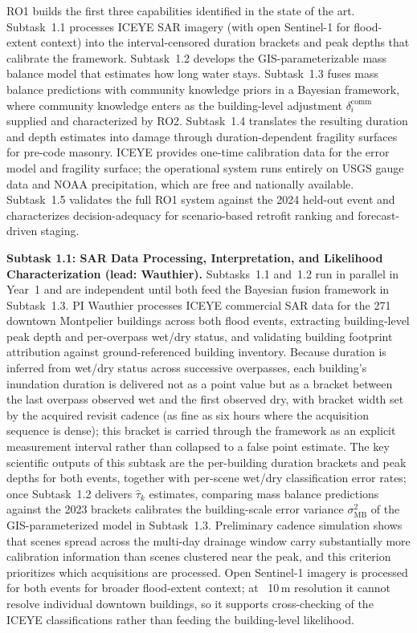 \documentclass[11pt]{article}
\begin{document}
RO1 builds the first three capabilities identified in the state of the art.
Subtask~1.1 processes ICEYE SAR imagery (with open Sentinel-1 for flood-extent
context) into the interval-censored duration brackets and peak depths that
calibrate the framework. Subtask~1.2 develops the GIS-parameterizable mass balance
model that estimates how long water stays. Subtask~1.3 fuses mass balance
predictions with community knowledge priors in a Bayesian framework, where
community knowledge enters as the building-level adjustment
$\delta_i^{\mathrm{comm}}$ supplied and characterized by RO2. Subtask~1.4
translates the resulting duration and depth estimates into damage through
duration-dependent fragility surfaces for pre-code masonry.
ICEYE provides one-time calibration data for the error model and fragility
surface; the operational system runs entirely on USGS gauge data and NOAA
precipitation, which are free and nationally available.
Subtask~1.5 validates the full RO1 system against the 2024 held-out event and
characterizes decision-adequacy for scenario-based retrofit ranking and forecast-driven staging.

\textbf{Subtask 1.1: SAR Data Processing, Interpretation, and Likelihood Characterization
(lead: Wauthier).}
Subtasks~1.1 and~1.2 run in parallel in Year~1 and are independent until both feed the Bayesian fusion framework in Subtask~1.3.
PI Wauthier processes ICEYE commercial SAR data for the 271 downtown Montpelier buildings across both flood events, extracting building-level peak depth and per-overpass wet/dry status, and validating building footprint attribution against ground-referenced building inventory.
Because duration is inferred from wet/dry status across successive overpasses, each building's inundation duration is delivered not as a point value but as a bracket between the last overpass observed wet and the first observed dry, with bracket width set by the acquired revisit cadence (as fine as six hours where the acquisition sequence is dense); this bracket is carried through the framework as an explicit measurement interval rather than collapsed to a false point estimate.
The key scientific outputs of this subtask are the per-building duration brackets and peak depths for both events, together with per-scene wet/dry classification error rates; once Subtask~1.2 delivers $\hat{\tau}_k$ estimates, comparing mass balance predictions against the 2023 brackets calibrates the building-scale error variance $\sigma_{\mathrm{MB}}^2$ of the GIS-parameterized model in Subtask~1.3.
Preliminary cadence simulation shows that scenes spread across the multi-day drainage window carry substantially more calibration information than scenes clustered near the peak, and this criterion prioritizes which acquisitions are processed.
Open Sentinel-1 imagery is processed for both events for broader flood-extent context; at ~10\,m resolution it cannot resolve individual downtown buildings, so it supports cross-checking of the ICEYE classifications rather than feeding the building-level likelihood.
\end{document}
